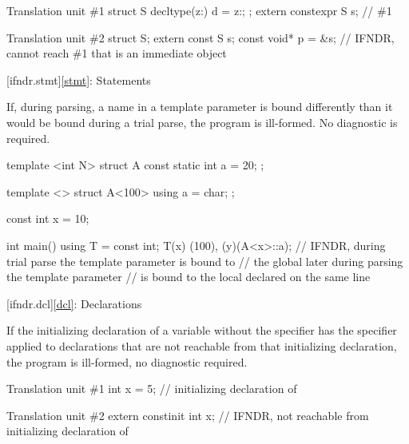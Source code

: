 \pnum
\begin{example}
\begin{codeblocktu}{Translation unit \#1}
struct S { decltype(^^::) d = ^^::; };
extern constexpr S s{};         // \#1
\end{codeblocktu}
\begin{codeblocktu}{Translation unit \#2}
struct S;
extern const S s;
const void* p = &s;             // IFNDR, cannot reach \#1 that is an immediate object
\end{codeblocktu}
\end{example}

[ifndr.stmt]{\ref*{stmt}: Statements}


\pnum
If, during
parsing, a name in a template parameter is bound differently than it would be bound during a trial parse,
the program is ill-formed. No diagnostic is required.

\pnum
\begin{example}
\begin{codeblock}
template <int N> struct A { const static int a = 20; };

template <> struct A<100> { using a = char; };

const int x = 10;

int main() {
  using T = const int;
  T(x)
  (100), (y)(A<x>::a);  // IFNDR, during trial parse the template parameter  is bound to
                        // the global  later during parsing the template parameter 
                        // is bound to the local  declared on the same line
}
\end{codeblock}
\end{example}

[ifndr.dcl]{\ref*{dcl}: Declarations}


\pnum
If the initializing declaration
of a variable without the  specifier
has the  specifier
applied to declarations that are not reachable from
that initializing declaration,
the program is ill-formed, no diagnostic required.

\pnum
\begin{example}
\begin{codeblocktu}{Translation unit \#1}
int x = 5;  // initializing declaration of 
\end{codeblocktu}
\begin{codeblocktu}{Translation unit \#2}
extern constinit int x;     // IFNDR, not reachable from initializing declaration of 
\end{codeblocktu}
\end{example}

